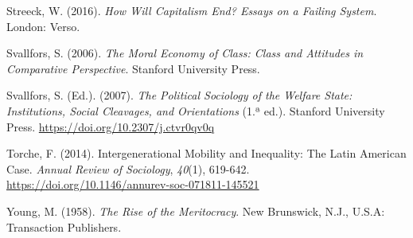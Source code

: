\documentclass[
  spanish,
  letterpaper,
  DIV=11,
  numbers=noendperiod,
  oneside]{scrartcl}
\newlength{\cslhangindent}
\newenvironment{CSLReferences}[2] %
 {\begin{list}{}{%
  \setlength{\itemindent}{0pt}
  \setlength{\leftmargin}{0pt}
  \setlength{\parsep}{0pt}
  \ifodd #1
   \setlength{\leftmargin}{\cslhangindent}
   \setlength{\itemindent}{-1\cslhangindent}
  \fi
  \setlength{\itemsep}{#2\baselineskip}}}
 {\end{list}}
\begin{document}
\begin{CSLReferences}{1}{0}
Streeck, W. (2016). \emph{How Will Capitalism End? Essays on a Failing
System}. London: Verso.

Svallfors, S. (2006). \emph{The {Moral Economy} of {Class}: {Class} and
{Attitudes} in {Comparative Perspective}}. Stanford University Press.

Svallfors, S. (Ed.). (2007). \emph{The {Political Sociology} of the
{Welfare State}: {Institutions}, {Social Cleavages}, and {Orientations}}
(1.ª ed.). Stanford University Press.
\url{https://doi.org/10.2307/j.ctvr0qv0q}

Torche, F. (2014). Intergenerational {Mobility} and {Inequality}: {The
Latin American Case}. \emph{Annual Review of Sociology}, \emph{40}(1),
619-642. \url{https://doi.org/10.1146/annurev-soc-071811-145521}

Young, M. (1958). \emph{The Rise of the Meritocracy}. New Brunswick,
N.J., U.S.A: Transaction Publishers.

\end{CSLReferences}
\end{document}
